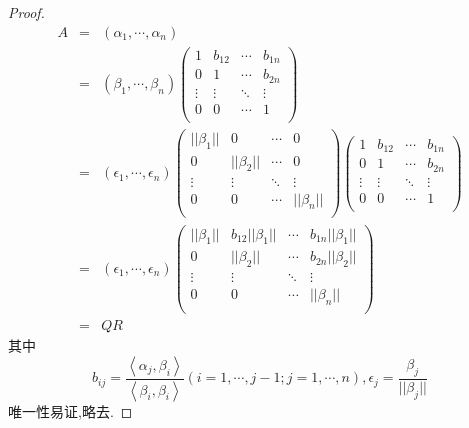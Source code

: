 \documentclass[UTF8,a4paper,notitlepage]{book}
\begin{document}
        \begin{proof}
            $$\begin{array}{rcl}
                A&=&(\alpha_1,\cdots,\alpha_n)\\ &=&
                (\beta_1,\cdots,\beta_n)\begin{pmatrix}
                1&b_{12}&\cdots&b_{1n}\\ 
                0&1&\cdots&b_{2n}\\ 
                \vdots&\vdots&\ddots&\vdots\\ 
                0&0&\cdots&1\\ 
                \end{pmatrix}\\ &=&
                (\epsilon_1,\cdots,\epsilon_n) \begin{pmatrix}
                ||\beta_1||&0&\cdots&0\\ 
                0&||\beta_2||&\cdots&0\\ 
                \vdots&\vdots&\ddots&\vdots\\ 
                0&0&\cdots&||\beta_n||\\ 
            \end{pmatrix}\begin{pmatrix}
                1&b_{12}&\cdots&b_{1n}\\ 
                0&1&\cdots&b_{2n}\\ 
                \vdots&\vdots&\ddots&\vdots\\ 
                0&0&\cdots&1\\ 
            \end{pmatrix}\\ &=&
            (\epsilon_1,\cdots,\epsilon_n) \begin{pmatrix}
                ||\beta_1||&b_{12}||\beta_1||&\cdots&b_{1n}||\beta_1||\\ 
                0&||\beta_2||&\cdots&b_{2n}||\beta_2||\\ 
                \vdots&\vdots&\ddots&\vdots\\ 
                0&0&\cdots&||\beta_n||\\ 
            \end{pmatrix}\\ &=&QR
            \end{array}$$
            其中$$b_{ij}=\frac{\left<\alpha_j,\beta_i\right>}{\left<\beta_i,\beta_i\right>}(i=1,\cdots,j-1;j=1,\cdots,n),\epsilon_j=\frac{\beta_j}{||\beta_j||}$$
            唯一性易证,略去.
        \end{proof}
\end{document}
